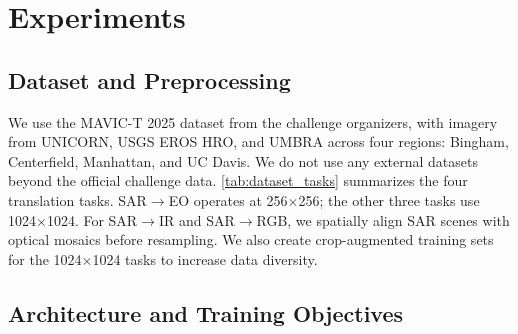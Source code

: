 \section{Experiments}
\label{sec:experiments}

\subsection{Dataset and Preprocessing}
\label{sec:dataset}

We use the MAVIC-T 2025 dataset from the challenge organizers, with imagery from UNICORN, USGS EROS HRO, and UMBRA across four regions: Bingham, Centerfield, Manhattan, and UC Davis. We do not use any external datasets beyond the official challenge data. \cref{tab:dataset_tasks} summarizes the four translation tasks. SAR$\rightarrow$EO operates at 256$\times$256; the other three tasks use 1024$\times$1024. For SAR$\rightarrow$IR and SAR$\rightarrow$RGB, we spatially align SAR scenes with optical mosaics before resampling. We also create crop-augmented training sets for the 1024$\times$1024 tasks to increase data diversity.

\begin{table}[t]
\centering
\caption{Task specifications and training data for the MAVIC-T challenge. Crop augmentation uses 1024$\times$1024 sliding windows with stride 512 (50\% overlap); SAR$\rightarrow$optical pairs are georeference-aligned.}
\label{tab:dataset_tasks}
%
\end{table}

\subsection{Architecture and Training Objectives}
\label{sec:objectives}

